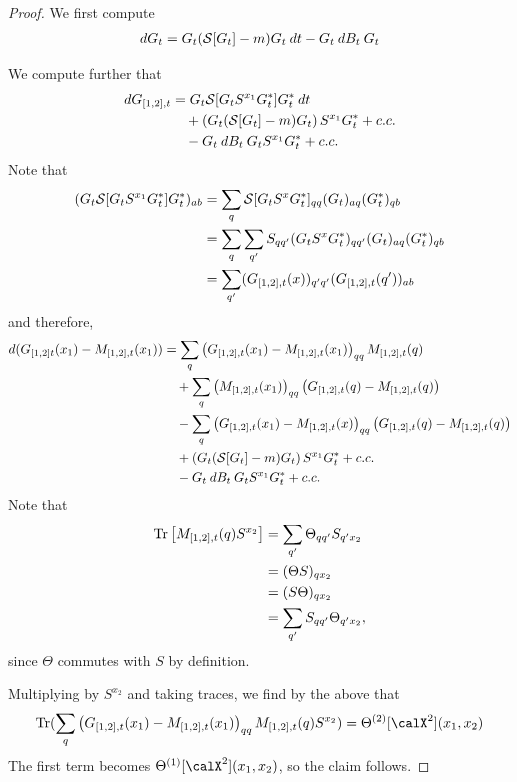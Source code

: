 \documentclass[11pt]{amsart}
\begin{document}
\begin{proof}
We first compute
\begin{align*}
dG_t = G_t (\mathcal{S}[G_t] - m) G_t\:dt - G_t\:dB_t\:G_t
\end{align*}

We compute further that
\begin{align*}
dG_{[1,2],t} &= G_t \mathcal{S}[G_t S^{x_1} G_t^{*}] G_t^{*}\: dt\\
&\quad + \left(G_t (\mathcal{S}[G_t] - m) G_t   \right) S^{x_1} G_t^{*} + c.c.\\
&\quad - G_t \: dB_t \: G_t S^{x_1} G_t^{*} + c.c.
\end{align*}
Note that
\begin{align*}
(G_t \mathcal{S}[G_t S^{x_1} G_t^{*}] G_t^{*})_{ab} 
&= \sum_{q} \mathcal{S}[G_t S^{x} G_t^{*}]_{qq}  (G_t)_{aq} (G^{*}_{t})_{qb}\\
&= \sum_q \sum_{q'}S_{qq'} (G_t S^{x} G_t^{*})_{qq'} (G_t)_{aq} (G^{*}_{t})_{qb}\\
&= \sum_{q'} (G_{[1,2],t}(x))_{q'q'} (G_{[1,2],t}(q'))_{ab}
\end{align*}
and therefore,
\begin{align*}
d(G_{[1,2]t}(x_1) - M_{[1,2],t}(x_1)) 
&= \sum_{q} \left( G_{[1,2],t }(x_1) - M_{[1,2],t}(x_1) \right)_{qq} M_{[1,2],t}(q)\\
&\quad +\sum_q \left( M_{[1,2],t}(x_1)\right)_{qq} \left( G_{[1,2],t}(q) - M_{[1,2],t}(q) \right) \\
&\quad - \sum_{q} \left( G_{[1,2],t }(x_1) - M_{[1,2],t}(x) \right)_{qq} \left( G_{[1,2],t}(q) - M_{[1,2],t}(q) \right)\\
&\quad + \left(G_t (\mathcal{S}[G_t] - m) G_t   \right) S^{x_1} G_t^{*} + c.c.\\
&\quad - G_t \: dB_t \: G_t S^{x_1} G_t^{*} + c.c.
\end{align*}
Note that
\begin{align*}
\operatorname{Tr}\left[ M_{[1,2],t}(q)S^{x_2} \right]  
&= \sum_{q'} \Theta_{qq'}S_{q'x_2}\\
&= (\Theta S)_{qx_2}\\
&= (S \Theta)_{qx_2}\\
&= \sum_{q'}S_{qq'} \Theta_{q'x_2},
\end{align*}
since $\Theta$ commutes with $S$ by definition.

Multiplying by $S^{x_2}$ and taking traces, we find by the above that
\begin{align*}
\Tr(\sum_{q} \left( G_{[1,2],t }(x_1) - M_{[1,2],t}(x_1) \right)_{qq} M_{[1,2],t}(q) S^{x_2})
=  \Theta^{(2)}[\calX^{2}](x_1,x_2)
\end{align*}
The first term becomes $\Theta^{(1)}[\calX^{2}](x_1,x_2)$, so the claim follows.
\end{proof}
\end{document}
